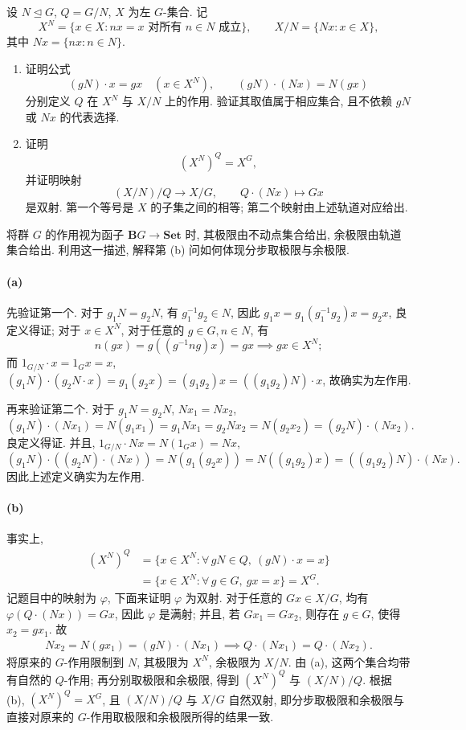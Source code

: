 \documentclass{article}
\begin{document}
\begin{problem}
设 $N\unlhd G$, $Q=G/N$, $X$ 为左 $G$-集合. 记
\[
  X^N=\{x\in X:nx=x\text{ 对所有 }n\in N\text{ 成立}\},\qquad X/N=\{Nx:x\in X\},
\]
其中 $Nx=\{nx:n\in N\}$.
\begin{enumerate}
  \item[(a)] 证明公式
  \[
    (gN)\cdot x=gx\quad(x\in X^N),\qquad (gN)\cdot(Nx)=N(gx)
  \]
  分别定义 $Q$ 在 $X^N$ 与 $X/N$ 上的作用. 验证其取值属于相应集合, 且不依赖 $gN$ 或 $Nx$ 的代表选择.
  \item[(b)] 证明
  \[
    (X^N)^Q=X^G,
  \]
  并证明映射
  \[
    (X/N)/Q\longrightarrow X/G,\qquad Q\cdot(Nx)\longmapsto Gx
  \]
  是双射. 第一个等号是 $X$ 的子集之间的相等; 第二个映射由上述轨道对应给出.
\end{enumerate}
将群 $G$ 的作用视为函子 $\mathbf BG\to\mathbf{Set}$ 时, 其极限由不动点集合给出, 余极限由轨道集合给出. 利用这一描述, 解释第 (b) 问如何体现分步取极限与余极限.
\end{problem}

\begin{solution}
	\paragraph{(a)} 先验证第一个. 对于 $g_1N = g_2N$, 有 $g_1^{-1}g_2 \in N$, 因此 $g_1 x = g_1 (g_1^{-1} g_2) x = g_2 x$, 良定义得证; 对于 $x 
	\in X^N$, 对于任意的 $g \in G, n \in N$, 有 
	\[ n(gx) = g((g^{-1}ng)x) = gx \implies gx \in X^N; \]
	而 $1_{G/N} \cdot x = 1_G x = x$, $(g_1N) \cdot (g_2N \cdot x) = g_1(g_2x) = (g_1g_2) x = ((g_1g_2)N) \cdot x$, 故确实为左作用.

	再来验证第二个. 对于 $g_1N = g_2N$, $Nx_1 = Nx_2$, 
	\[ (g_1N) \cdot (Nx_1) = N(g_1x_1) = g_1Nx_1 = g_2Nx_2 = N(g_2 x_2) = (g_2N) \cdot (Nx_2). \]
	良定义得证. 并且, $1_{G/N} \cdot Nx = N(1_Gx) = Nx$, 
	\[ (g_1N) \cdot((g_2N) \cdot (Nx)) = N(g_1(g_2x)) = N((g_1g_2)x) = ((g_1g_2)N) \cdot (Nx). \]
	因此上述定义确实为左作用.

	\paragraph{(b)} 事实上, 
	\begin{align*}
		(X^N)^Q &= \{x \in X^N: \forall\,gN \in Q,\ (gN) \cdot x = x\} \\
		&= \{x \in X^N: \forall\,g \in G,\ gx = x\} = X^G.
	\end{align*} 
	记题目中的映射为 $\varphi$, 下面来证明 $\varphi$ 为双射. 对于任意的 $Gx \in X/G$, 均有 $\varphi(Q\cdot (Nx)) = Gx$, 因此 $\varphi$ 是满射; 并且, 若 $Gx_1 = Gx_2$, 则存在 $g \in G$, 使得 $x_2 = gx_1$. 故
	\begin{gather*}
		Nx_2 = N(gx_1) = (gN) \cdot (Nx_1) \implies Q\cdot (Nx_1) = Q\cdot (Nx_2).
	\end{gather*}
	将原来的 $G$-作用限制到 $N$, 其极限为 $X^N$, 余极限为 $X/N$. 由 (a), 这两个集合均带有自然的 $Q$-作用; 再分别取极限和余极限, 得到 $(X^N)^Q$ 与 $(X/N)/Q$. 根据 (b), $(X^N)^Q = X^G$, 且 $(X/N)/Q$ 与 $X/G$ 自然双射, 即分步取极限和余极限与直接对原来的 $G$-作用取极限和余极限所得的结果一致.
\end{solution}
\end{document}
